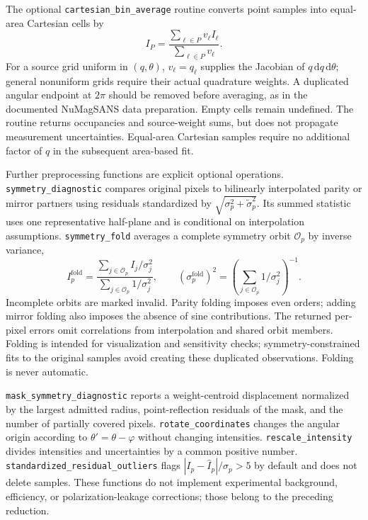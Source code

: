 \documentclass[aps,prb,preprint,onecolumn,notitlepage,amsmath,amssymb,
  superscriptaddress,floatfix]{revtex4-2}
\newcommand{\dd}{\,\mathrm{d}}
\begin{document}
The optional \texttt{cartesian\_bin\_average} routine converts point
samples into equal-area Cartesian cells by
\begin{equation}
 I_P=\frac{\sum_{\ell\in P}v_\ell I_\ell}
            {\sum_{\ell\in P}v_\ell}.
 \label{eq:rebinning}
\end{equation}
For a source grid uniform in $(q,\theta)$, $v_\ell=q_\ell$ supplies the
Jacobian of $q\dd q\dd\theta$; general nonuniform grids require their
actual quadrature weights. A duplicated angular endpoint at $2\pi$ should
be removed before averaging, as in the documented NuMagSANS data
preparation. Empty cells remain undefined. The routine returns occupancies
and source-weight sums, but does not propagate measurement uncertainties.
Equal-area Cartesian samples require no additional factor of $q$ in the
subsequent area-based fit.

Further preprocessing functions are explicit optional operations.
\texttt{symmetry\_diagnostic} compares original pixels to bilinearly
interpolated parity or mirror partners using residuals standardized by
$\sqrt{\sigma_p^2+\widetilde\sigma_p^2}$. Its summed statistic uses one
representative half-plane and is conditional on interpolation assumptions.
\texttt{symmetry\_fold} averages a complete symmetry orbit $\mathcal{O}_p$
by inverse variance,
\begin{equation}
 I_p^{\mathrm{fold}}=
 \frac{\sum_{j\in\mathcal{O}_p}I_j/\sigma_j^2}
      {\sum_{j\in\mathcal{O}_p}1/\sigma_j^2},\qquad
 (\sigma_p^{\mathrm{fold}})^2=
 \left(\sum_{j\in\mathcal{O}_p}1/\sigma_j^2\right)^{-1}.
 \label{eq:folding}
\end{equation}
Incomplete orbits are marked invalid. Parity folding imposes even orders;
adding mirror folding also imposes the absence of sine contributions.
The returned per-pixel errors omit correlations from interpolation and
shared orbit members. Folding is intended for visualization and sensitivity
checks; symmetry-constrained fits to the original samples avoid creating
these duplicated observations. Folding is never automatic.

\texttt{mask\_symmetry\_diagnostic} reports a weight-centroid displacement
normalized by the largest admitted radius, point-reflection residuals of
the mask, and the number of partially covered pixels.
\texttt{rotate\_coordinates} changes the angular origin according to
$\theta'=\theta-\varphi$ without changing intensities.
\texttt{rescale\_intensity} divides intensities and uncertainties by a
common positive number. \texttt{standardized\_residual\_outliers} flags
$|I_p-\widehat I_p|/\sigma_p>5$ by default and does not delete samples.
These functions do not implement experimental background, efficiency, or
polarization-leakage corrections; those belong to the preceding reduction.
\end{document}
